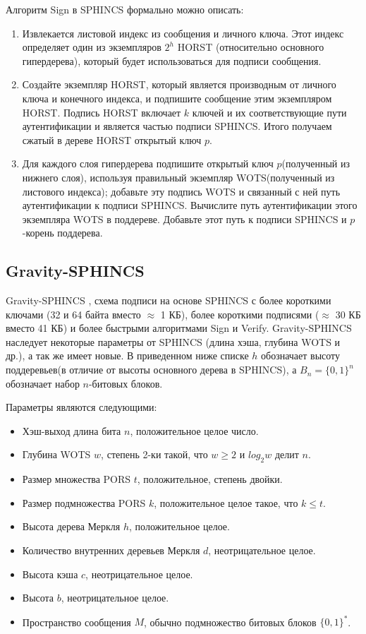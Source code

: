 \documentclass[a4paper, 14pt]{extarticle}
\begin{document}
Алгоритм Sign в SPHINCS формально можно описать:

\begin{enumerate}
    \item Извлекается листовой индекс из сообщения и личного ключа. Этот индекс определяет один из экземпляров $2^{h}$ HORST (относительно основного гипердерева), который будет использоваться для подписи сообщения.
    \item Создайте экземпляр HORST, который является производным от личного ключа и конечного индекса, и подпишите сообщение этим экземпляром HORST. Подпись HORST включает $k$ ключей и их соответствующие пути аутентификации и является частью подписи SPHINCS. Итого получаем сжатый в дереве HORST открытый ключ $p$.
    \item Для каждого слоя гипердерева подпишите открытый ключ $p$(полученный из нижнего слоя), используя правильный экземпляр WOTS(полученный из листового индекса); добавьте эту подпись WOTS и связанный с ней путь аутентификации к подписи SPHINCS. Вычислите путь аутентификации этого экземпляра WOTS в поддереве. Добавьте этот путь к подписи SPHINCS и $p$-корень поддерева.
\end{enumerate}

\subsection{Gravity-SPHINCS}
\label{gravity-sphincs}
Gravity-SPHINCS \cite{stateless}, схема подписи на основе SPHINCS с более короткими ключами (32 и 64 байта вместо $\approx$ 1 КБ), более короткими подписями ($\approx$ 30 КБ вместо 41 КБ) и более быстрыми алгоритмами Sign и Verify.
Gravity-SPHINCS наследует некоторые параметры от SPHINCS (длина хэша, глубина WOTS и др.), а так же имеет новые. В приведенном ниже списке $h$ обозначает высоту поддеревьев(в отличие от высоты основного дерева в SPHINCS), а $B_{n} = \{0,1\}^{n}$ обозначает набор $n$-битовых блоков.
\newline

Параметры являются следующими:

\begin{itemize}
    \item Хэш-выход длина бита $n$, положительное целое число.
    \item Глубина WOTS $w$, степень 2-ки такой, что $w \geq 2$ и $log_{2}w$ делит $n$.
    \item Размер множества PORS $t$, положительное, степень двойки.
    \item Размер подмножества PORS $k$, положительное целое такое, что $k \leq t$.
    \item Высота дерева Меркля $h$, положительное целое.
    \item Количество внутренних деревьев Меркля $d$, неотрицательное целое.
    \item Высота кэша $c$, неотрицательное целое.
    \item Высота $b$, неотрицательное целое.
    \item Пространство сообщения $M$, обычно подмножество битовых блоков $\{0,1\}^{*}$.
\end{itemize}
\end{document}
